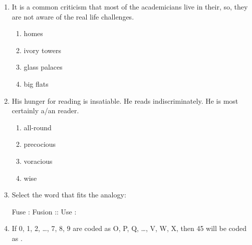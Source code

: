 \documentclass[journal]{IEEEtran}
\begin{document}
\begin{enumerate}
\item It is a common criticism that most of the academicians live in their\underline{\hspace{2cm}}, so, they are not aware of the real life challenges. \hfill {}
    
\begin{enumerate}
\item homes  
\item ivory towers  
\item glass palaces  
\item big flats
\end{enumerate}

\item His hunger for reading is insatiable. He reads indiscriminately. He is most certainly a/an \underline{\hspace{2cm}} reader. \hfill {}

\begin{enumerate}
\item all-round  
\item precocious  
\item voracious  
\item wise
\end{enumerate}

\item Select the word that fits the analogy:

\begin{center}
    Fuse : Fusion :: Use : \underline{\hspace{2cm}}
\end{center} 
\hfill {}

\begin{enumerate}

\end{enumerate}

\item If 0, 1, 2, \ldots, 7, 8, 9 are coded as O, P, Q, \ldots, V, W, X, then 45 will be coded as \underline{\hspace{2cm}}. \hfill {}


\end{enumerate}
\end{document}
